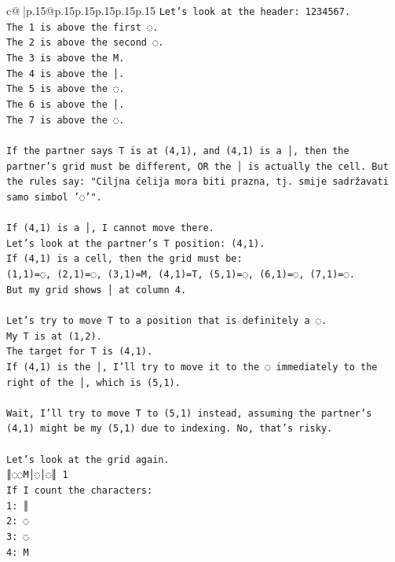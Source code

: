 \documentclass{article}
\begin{document}
{\begin{supertabular}{c@{$\;$}|p{.15\linewidth}@{}p{.15\linewidth}p{.15\linewidth}p{.15\linewidth}p{.15\linewidth}p{.15\linewidth}}
{{{\texttt{Let's look at the header:  1234567.} \\
\texttt{The 1 is above the first ◌.} \\
\texttt{The 2 is above the second ◌.} \\
\texttt{The 3 is above the M.} \\
\texttt{The 4 is above the │.} \\
\texttt{The 5 is above the ◌.} \\
\texttt{The 6 is above the │.} \\
\texttt{The 7 is above the ◌.} \\
\\ 
\texttt{If the partner says T is at (4,1), and (4,1) is a │, then the partner's grid must be different, OR the │ is actually the cell. But the rules say: "Ciljna ćelija mora biti prazna, tj. smije sadržavati samo simbol '◌'".} \\
\\ 
\texttt{If (4,1) is a │, I cannot move there.} \\
\texttt{Let's look at the partner's T position: (4,1).} \\
\texttt{If (4,1) is a cell, then the grid must be:} \\
\texttt{(1,1)=◌, (2,1)=◌, (3,1)=M, (4,1)=T, (5,1)=◌, (6,1)=◌, (7,1)=◌.} \\
\texttt{But my grid shows │ at column 4.} \\
\\ 
\texttt{Let's try to move T to a position that is definitely a ◌.} \\
\texttt{My T is at (1,2).} \\
\texttt{The target for T is (4,1).} \\
\texttt{If (4,1) is the │, I'll try to move it to the ◌ immediately to the right of the │, which is (5,1).} \\
\\ 
\texttt{Wait, I'll try to move T to (5,1) instead, assuming the partner's (4,1) might be my (5,1) due to indexing. No, that's risky.} \\
\\ 
\texttt{Let's look at the grid again.} \\
\texttt{║◌◌M│◌│◌║ 1} \\
\texttt{If I count the characters:} \\
\texttt{1: ║} \\
\texttt{2: ◌} \\
\texttt{3: ◌} \\
\texttt{4: M} \\
}}}
\end{supertabular}}
\end{document}
